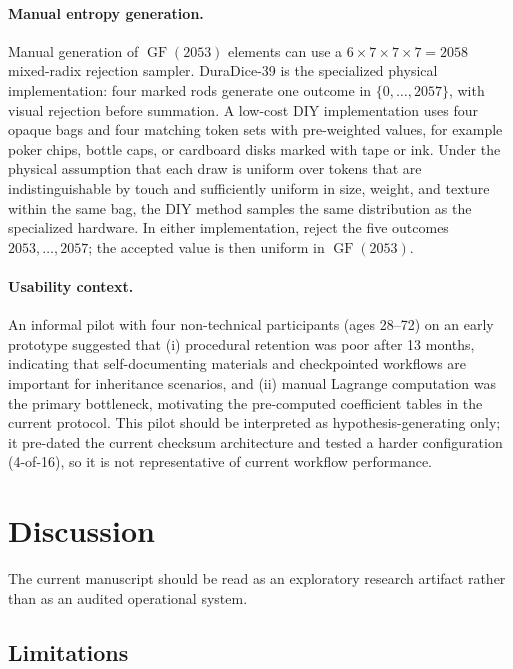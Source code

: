 \documentclass[11pt]{article}
\newcommand{\GF}{\operatorname{GF}}
\begin{document}
\paragraph{Manual entropy generation.} Manual generation of $\GF(2053)$ elements can use a $6 \times 7 \times 7 \times 7 = 2058$ mixed-radix rejection sampler. DuraDice-39 is the specialized physical implementation: four marked rods generate one outcome in $\{0,\ldots,2057\}$, with visual rejection before summation. A low-cost DIY implementation uses four opaque bags and four matching token sets with pre-weighted values, for example poker chips, bottle caps, or cardboard disks marked with tape or ink. Under the physical assumption that each draw is uniform over tokens that are indistinguishable by touch and sufficiently uniform in size, weight, and texture within the same bag, the DIY method samples the same distribution as the specialized hardware. In either implementation, reject the five outcomes $2053,\ldots,2057$; the accepted value is then uniform in $\GF(2053)$.

\paragraph{Usability context.} An informal pilot with four non-technical participants (ages 28--72) on an early prototype suggested that (i) procedural retention was poor after 13 months, indicating that self-documenting materials and checkpointed workflows are important for inheritance scenarios, and (ii) manual Lagrange computation was the primary bottleneck, motivating the pre-computed coefficient tables in the current protocol. This pilot should be interpreted as hypothesis-generating only; it pre-dated the current checksum architecture and tested a harder configuration (4-of-16), so it is not representative of current workflow performance.

\section{Discussion}
\label{sec:discussion}

The current manuscript should be read as an exploratory research artifact rather than as an audited operational system.

\subsection{Limitations}
\end{document}
